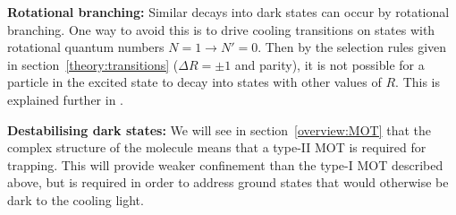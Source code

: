 \textbf{Rotational branching:} Similar decays into dark states can occur by
rotational branching. One way to avoid this is to drive cooling transitions on
states with rotational quantum numbers $N=1 \rightarrow N'=0$. Then by the
selection rules given in section~\ref{theory:transitions} ($\Delta R =  \pm1$
and parity), it is not possible for a particle in the excited state to decay
into states with other values of $R$. This is explained further in
.

\textbf{Destabilising dark states:} We will see in section~\ref{overview:MOT}
that the complex structure of the molecule means that a type-II MOT is required
for trapping. This will provide weaker confinement than the type-I MOT
described above, but is required in order to address ground states that would
otherwise be dark to the cooling light.
